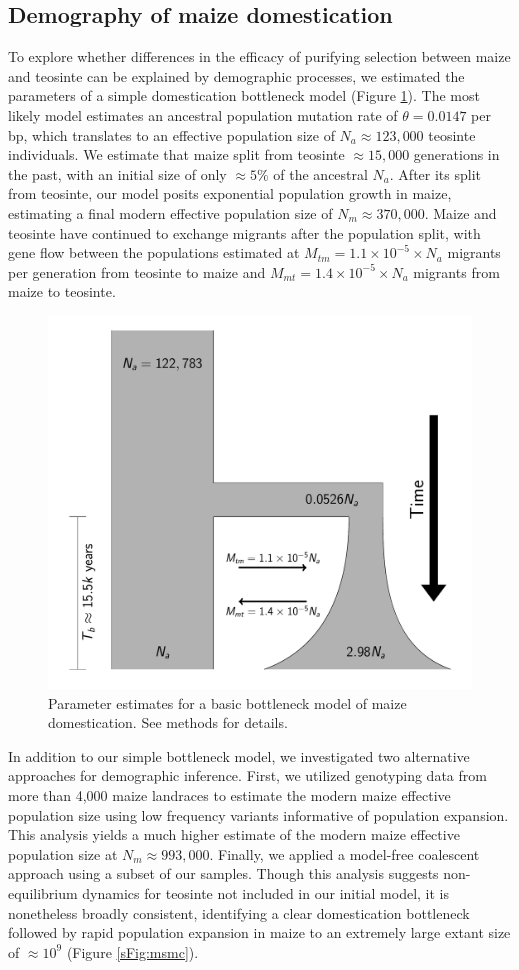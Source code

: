 \documentclass{pnastwo}
\begin{document}
\begin{article}
\subsection{Demography of maize domestication} %
To explore whether differences in the efficacy of purifying selection between maize and teosinte can be explained by demographic processes, we estimated the parameters of a simple domestication bottleneck model  (Figure \ref{fig:bottleneck}). 
The most likely model estimates an ancestral population mutation rate of $\theta=0.0147$ per bp, which translates to an effective population size of $N_a \approx 123,000$ teosinte individuals.
We estimate that maize split from teosinte $\approx 15,000$ generations in the past, with an initial size of only $\approx 5\% $ of the ancestral $N_a$. 
After its split from teosinte, our model posits exponential population growth in maize, estimating a final modern effective population size of $N_m \approx 370,000$.
Maize and teosinte have continued to exchange migrants after the population split, with gene flow between the populations estimated at $M_{tm} =  1.1 \times 10^{-5} \times N_a $  migrants per generation from teosinte to maize and $M_{mt} =  1.4 \times 10^{-5} \times N_a$ migrants from maize to teosinte. 

\begin{figure}[!tb]
\centering
\includegraphics[width=.4\textwidth]{FigsAndFiles/DomesticationModel/domesticationModel.pdf}
\caption{Parameter estimates for a basic bottleneck model of maize domestication. See methods for details. \label{fig:bottleneck} }
\end{figure}

In addition to our simple bottleneck model, we investigated two alternative approaches for demographic inference.  First, we utilized genotyping data from more than 4,000 maize landraces \cite{Hearne2015} to estimate the modern maize effective population size using low frequency variants  informative of population expansion. 
This analysis yields a much higher estimate of the modern maize effective population size at  $N_m \approx 993,000$.
Finally, we applied a model-free coalescent approach \cite{schiffels2014} using a subset of our samples. 
Though this analysis suggests non-equilibrium dynamics for teosinte not included in our initial model, it is nonetheless broadly consistent, identifying a clear domestication bottleneck followed by rapid population expansion in maize to an extremely large extant size of $\approx 10^9$ (Figure \ref{sFig:msmc}).


\end{article}
\end{document}

